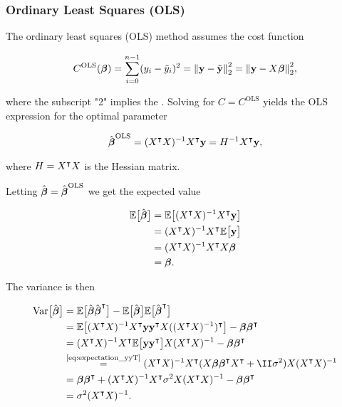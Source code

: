 \subsubsection{Ordinary Least Squares (OLS)}\label{sec:OLS}

The ordinary least squares (OLS) method assumes the cost function

\begin{align*}
    C^\text{OLS}(\boldsymbol{\beta}) = \sum_{i=0}^{n-1}(y_i - \tilde{y}_i)^2 =  \norm{\mathbf{y}-\tilde{\mathbf{y}}}_2^{2} = \norm{\mathbf{y}-X\boldsymbol{\beta}}_2^{2},
\end{align*}

where the subscript "2" implies the \footnotemark. Solving  for $C=C^\text{OLS}$ yields the OLS expression for the optimal parameter

\begin{align}\label{eq:optimal_beta_ols}
    \hat{\boldsymbol{\beta}}^\text{OLS} = (X^\intercal X)^{-1} X^\intercal \mathbf{y} = H^{-1} X^\intercal \mathbf{y},
\end{align}

where $H = X^\intercal X$ is the Hessian matrix.

Letting $\hat{\boldsymbol{\beta}} = \hat{\boldsymbol{\beta}}^\text{OLS}$ we get the expected value 

\begin{align*}
    \mathbb{E}\big[\hat{\boldsymbol{\beta}}\big] &= \mathbb{E}\big[(X^\intercal X)^{-1} X^\intercal \mathbf{y}\big] \\
    &= (X^\intercal X)^{-1} X^\intercal \mathbb{E}\big[\mathbf{y}\big] \\
    &= (X^\intercal X)^{-1} X^\intercal X \boldsymbol{\beta} \\
    &= \boldsymbol{\beta}.
\end{align*}

The variance is then 

\begin{align}\label{eq:variance_of_optimal_beta_ols}\nonumber 
    \variance{\optbeta} &= \EE{\optbeta \optbeta\TT} -\EE{\optbeta} \EE{\optbeta\TT} \nonumber \\
    &= \EE{\invhessian X\TT  \vec{y} \vec{y}\TT X (\invhessian)\TT} - \svec{\beta} \svec{\beta}\TT \nonumber \\
    &= \invhessian X\TT \EE{ \vec{y} \vec{y}\TT } X \invhessian - \svec{\beta} \svec{\beta}\TT \nonumber \\
    &\stackrel{\text{\eqref{eq:expectation_yyT}}}{=}\invhessian X\TT ( X\svec{\beta} \svec{\beta}\TT X\TT+ \II\sigma^2) X \invhessian \nonumber \\
    &= \svec{\beta} \svec{\beta} \TT + \invhessian X\TT \sigma^2 X \invhessian - \svec{\beta} \svec{\beta} \TT \nonumber \\
    &= \sigma^2 \invhessian.
\end{align}



